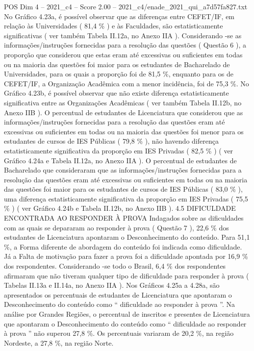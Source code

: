 \begin{textsample}{POS Dim 4 – 2021\_c4 – Score 2.00 – 2021\_c4/enade\_2021\_qui\_a7d57fa827.txt}
No Gráfico 4.23a, é possível observar que as diferenças entre CEFET/IF, em relação às Universidades ( 81,4 \% ) e às Faculdades, são estatisticamente significativas ( ver também Tabela II.12a, no Anexo IIA ).
Considerando -se as informações/instruções fornecidas para a resolução das questões ( Questão 6 ), a proporção que considerou que estas eram até excessivas ou suficientes em todas ou na maioria das questões foi maior para os estudantes de Bacharelado de Universidades, para os quais a proporção foi de 81,5 \%, enquanto para os de CEFET/IF, a Organização Acadêmica com a menor incidência, foi de 75,3 \%.
No Gráfico 4.23b, é possível observar que não existe diferença estatisticamente significativa entre as Organizações Acadêmicas ( ver também Tabela II.12b, no Anexo IIB ).
O percentual de estudantes de Licenciatura que considerou que as informações/instruções fornecidas para a resolução das questões eram até excessivas ou suficientes em todas ou na maioria das questões foi menor para os estudantes de cursos de IES Públicas ( 79,8 \% ), não havendo diferença estatisticamente significativa da proporção em IES Privadas ( 82,5 \% ) ( ver Gráfico 4.24a e Tabela II.12a, no Anexo IIA ).
O percentual de estudantes de Bacharelado que consideraram que as informações/instruções fornecidas para a resolução das questões eram até excessivas ou suficientes em todas ou na maioria das questões foi maior para os estudantes de cursos de IES Públicas ( 83,0 \% ), uma diferença estatisticamente significativa da proporção em IES Privadas ( 75,5 \% ) ( ver Gráfico 4.24b e Tabela II.12b, no Anexo IIB ). 4.5 DIFICULDADE ENCONTRADA AO RESPONDER À PROVA Indagados sobre as dificuldades com as quais se depararam ao responder à prova ( Questão 7 ), 22,6 \% dos estudantes de Licenciatura apontaram o Desconhecimento do conteúdo.
Para 51,1 \%, a Forma diferente de abordagem do conteúdo foi indicada como dificuldade.
Já a Falta de motivação para fazer a prova foi a dificuldade apontada por 16,9 \% dos respondentes.
Considerando -se todo o Brasil, 6,4 \% dos respondentes afirmaram que não tiveram qualquer tipo de dificuldade para responder à prova ( Tabelas II.13a e II.14a, no Anexo IIA ).
Nos Gráficos 4.25a a 4.28a, são apresentados os percentuais de estudantes de Licenciatura que apontaram o Desconhecimento do conteúdo como “ dificuldade ao responder à prova ”.
Na análise por Grandes Regiões, o percentual de inscritos e presentes de Licenciatura que apontaram o Desconhecimento do conteúdo como “ dificuldade ao responder à prova ” não superou 27,8 \%.
Os percentuais variaram de 20,2 \%, na região Nordeste, a 27,8 \%, na região Norte.

\end{textsample}

